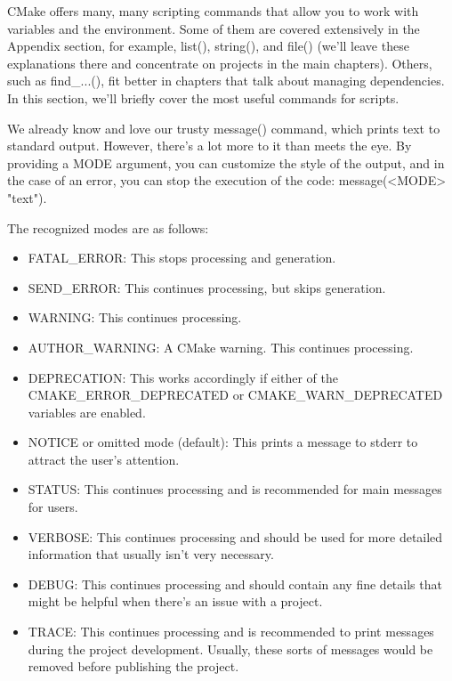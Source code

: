 
CMake offers many, many scripting commands that allow you to work with variables and the environment. Some of them are covered extensively in the Appendix section, for example, list(), string(), and file() (we'll leave these explanations there and concentrate on projects in the main chapters). Others, such as find\_...(), fit better in chapters that talk about managing dependencies. In this section, we'll briefly cover the most useful commands for scripts.


We already know and love our trusty message() command, which prints text to standard output. However, there's a lot more to it than meets the eye. By providing a MODE argument, you can customize the style of the output, and in the case of an error, you can stop the execution of the code: message(<MODE> "text").

The recognized modes are as follows:

\begin{itemize}
\item 
FATAL\_ERROR: This stops processing and generation.

\item 
SEND\_ERROR: This continues processing, but skips generation.

\item 
WARNING: This continues processing.

\item 
AUTHOR\_WARNING: A CMake warning. This continues processing.

\item 
DEPRECATION: This works accordingly if either of the CMAKE\_ERROR\_DEPRECATED or CMAKE\_WARN\_DEPRECATED variables are enabled.

\item 
NOTICE or omitted mode (default): This prints a message to stderr to attract the user's attention.

\item 
STATUS: This continues processing and is recommended for main messages for users.

\item 
VERBOSE: This continues processing and should be used for more detailed information that usually isn't very necessary.

\item 
DEBUG: This continues processing and should contain any fine details that might be helpful when there's an issue with a project.

\item 
TRACE: This continues processing and is recommended to print messages during the project development. Usually, these sorts of messages would be removed before publishing the project.
\end{itemize}

